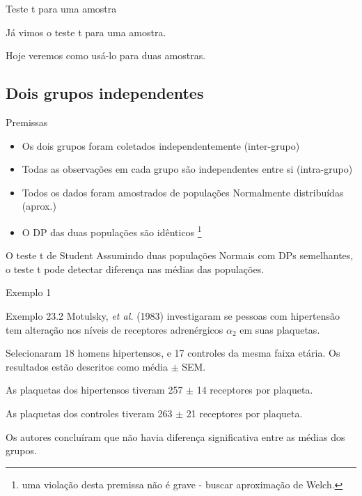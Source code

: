 \documentclass{beamer}
\begin{document}
\begin{frame}{\scriptsize Teste t para uma amostra}
  \begin{center}
    \large
    Já vimos o teste t para uma amostra.

    \bigskip

    Hoje veremos como usá-lo para duas amostras.
  \end{center}
\end{frame}

\subsection{Dois grupos independentes}

\begin{frame}{\scriptsize Premissas}
  \begin{itemize}
    \footnotesize
  \item Os dois grupos foram coletados independentemente (inter-grupo)
  \item Todas as observações em cada grupo são independentes entre si (intra-grupo)
  \item Todos os dados foram amostrados de populações Normalmente distribuídas (aprox.)
  \item O DP das duas populações são idênticos \footnote{uma violação desta premissa não é grave - buscar aproximação de Welch.}
  \end{itemize}
\end{frame}

\begin{frame}{\scriptsize }
  \begin{block}{O teste t de Student}
      Assumindo duas populações Normais com DPs semelhantes, o teste t pode detectar diferença nas médias das populações.
  \end{block}
\end{frame}

\begin{frame}{\scriptsize Exemplo 1}
  \begin{exampleblock}{Exemplo 23.2}
    \footnotesize
    Motulsky, {\em et al.} (1983) investigaram se pessoas com hipertensão tem alteração nos níveis de receptores adrenérgicos $\alpha_2$ em suas plaquetas.

    \bigskip
    {\footnotesize
      Selecionaram 18 homens hipertensos, e 17 controles da mesma faixa etária.
      Os resultados estão descritos como média $\pm$ SEM.
    }

    \begin{exampleblock}{}
      \footnotesize
      As plaquetas dos hipertensos tiveram 257 $\pm$ 14 receptores por plaqueta.

      As plaquetas dos controles tiveram 263 $\pm$ 21 receptores por plaqueta.
    \end{exampleblock}
    \bigskip
    Os autores concluíram que não havia diferença significativa entre as médias dos grupos.
  \end{exampleblock}
\end{frame}
\end{document}
